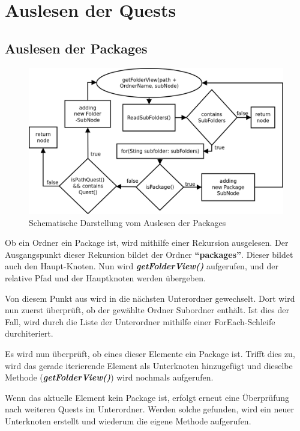 \section{Auslesen der Quests}
\subsection{Auslesen der Packages}

\begin{figure}[h] 
  \centering
     \includegraphics[width=1\textwidth]{./media/images/gui/package-tree-rekursion.png}
  \caption{Schematische Darstellung vom Auslesen der Packages}
  \label{fig:Package_Tree_Rekursion}
\end{figure}

Ob ein Ordner ein Package ist, wird mithilfe einer Rekursion ausgelesen. Der Ausgangspunkt dieser Rekursion bildet der Ordner \textbf{"`packages"'}. Dieser bildet auch den Haupt-Knoten. Nun wird \textit{\textbf{getFolderView()}} aufgerufen, und der relative Pfad und der Hauptknoten werden übergeben.

Von diesem Punkt aus wird in die nächsten Unterordner gewechselt. Dort wird nun zuerst überprüft, ob der gewählte Ordner Subordner enthält. Ist dies der Fall, wird durch die Liste der Unterordner mithilfe einer ForEach-Schleife durchiteriert.

Es wird nun überprüft, ob eines dieser Elemente ein Package ist. Trifft dies zu, wird das gerade iterierende Element als Unterknoten hinzugefügt und dieselbe Methode (\textit{\textbf{getFolderView()}}) wird nochmals aufgerufen.

Wenn das aktuelle Element kein Package ist, erfolgt erneut eine Überprüfung nach weiteren Quests im Unterordner. Werden solche gefunden, wird ein neuer Unterknoten erstellt und wiederum die eigene Methode aufgerufen.

